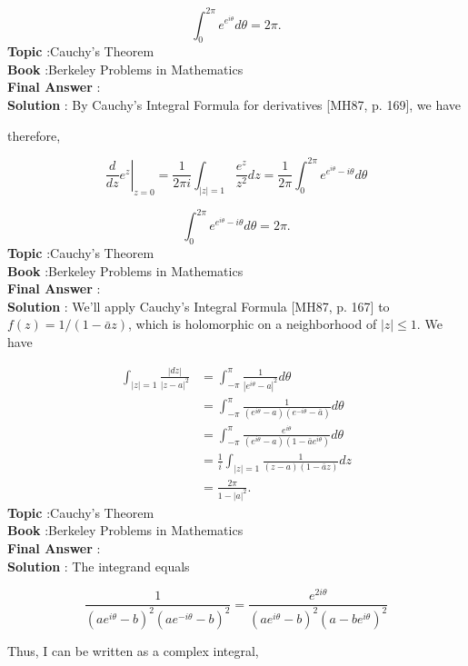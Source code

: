 \documentclass[10pt]{article}
\begin{document}
$$
\int_{0}^{2 \pi} e^{e^{i \theta}} d \theta=2 \pi .
$$
\textbf{Topic} :Cauchy's Theorem \\
\textbf{Book} :Berkeley Problems in Mathematics\\
\textbf{Final Answer} :\\


\textbf{Solution} : By Cauchy's Integral Formula for derivatives [MH87, p. 169], we have

therefore,

$$
\left.\frac{d}{d z} e^{z}\right|_{z=0}=\frac{1}{2 \pi i} \int_{|z|=1} \frac{e^{z}}{z^{2}} d z=\frac{1}{2 \pi} \int_{0}^{2 \pi} e^{e^{i \theta}-i \theta} d \theta
$$

$$
\int_{0}^{2 \pi} e^{e^{i \theta}-i \theta} d \theta=2 \pi .
$$
\textbf{Topic} :Cauchy's Theorem \\
\textbf{Book} :Berkeley Problems in Mathematics\\
\textbf{Final Answer} :\\


\textbf{Solution} : We'll apply Cauchy's Integral Formula [MH87, p. 167] to $f(z)=1 /(1-\bar{a} z)$, which is holomorphic on a neighborhood of $|z| \leqslant 1$. We have

$$
\begin{aligned}
\int_{|z|=1} \frac{|d z|}{|z-a|^{2}} &=\int_{-\pi}^{\pi} \frac{1}{\left|e^{i \theta}-a\right|^{2}} d \theta \\
&=\int_{-\pi}^{\pi} \frac{1}{\left(e^{i \theta}-a\right)\left(e^{-i \theta}-\bar{a}\right)} d \theta \\
&=\int_{-\pi}^{\pi} \frac{e^{i \theta}}{\left(e^{i \theta}-a\right)\left(1-\bar{a} e^{i \theta}\right)} d \theta \\
&=\frac{1}{i} \int_{|z|=1} \frac{1}{(z-a)(1-\bar{a} z)} d z \\
&=\frac{2 \pi}{1-|a|^{2}} .
\end{aligned}
$$
\textbf{Topic} :Cauchy's Theorem \\
\textbf{Book} :Berkeley Problems in Mathematics\\
\textbf{Final Answer} :\\


\textbf{Solution} : The integrand equals

$$
\frac{1}{\left(a e^{i \theta}-b\right)^{2}\left(a e^{-i \theta}-b\right)^{2}}=\frac{e^{2 i \theta}}{\left(a e^{i \theta}-b\right)^{2}\left(a-b e^{i \theta}\right)^{2}}
$$

Thus, I can be written as a complex integral,
\end{document}
